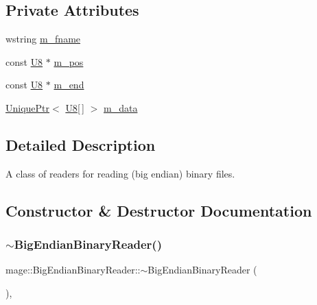 \subsection*{Private Attributes}
\begin{DoxyCompactItemize}
\item 
wstring \hyperlink{classmage_1_1_big_endian_binary_reader_a0f836aec582a59f156b64bffb9653e41}{m\+\_\+fname}
\item 
const \hyperlink{namespacemage_afc638980bc6154f15af5e2d93a0e0ea9}{U8} $\ast$ \hyperlink{classmage_1_1_big_endian_binary_reader_a7dbfc5ce1712e431f75d80a4f7a56e33}{m\+\_\+pos}
\item 
const \hyperlink{namespacemage_afc638980bc6154f15af5e2d93a0e0ea9}{U8} $\ast$ \hyperlink{classmage_1_1_big_endian_binary_reader_ab4f707d30799b98afed0f9adfc27a3e2}{m\+\_\+end}
\item 
\hyperlink{namespacemage_a3316d7143a973e37adf1110f2e80ca31}{Unique\+Ptr}$<$ \hyperlink{namespacemage_afc638980bc6154f15af5e2d93a0e0ea9}{U8}\mbox{[}$\,$\mbox{]} $>$ \hyperlink{classmage_1_1_big_endian_binary_reader_a54128bdaa233c1bd20494189b2397fe3}{m\+\_\+data}
\end{DoxyCompactItemize}


\subsection{Detailed Description}
A class of readers for reading (big endian) binary files. 

\subsection{Constructor \& Destructor Documentation}
\hypertarget{classmage_1_1_big_endian_binary_reader_ae85a40e8ed06e8c887e38d914843b8d3}{}\label{classmage_1_1_big_endian_binary_reader_ae85a40e8ed06e8c887e38d914843b8d3} 
\subsubsection{\texorpdfstring{$\sim$\+Big\+Endian\+Binary\+Reader()}{~BigEndianBinaryReader()}}
{\footnotesize\ttfamily mage\+::\+Big\+Endian\+Binary\+Reader\+::$\sim$\+Big\+Endian\+Binary\+Reader (\begin{DoxyParamCaption}{ }\end{DoxyParamCaption})\hspace{0.3cm}{\ttfamily [virtual]}, {\ttfamily [default]}}

